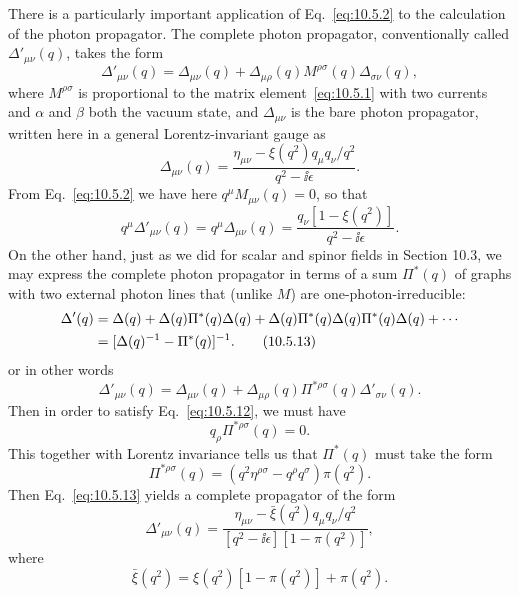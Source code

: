 There is a particularly important application of Eq.~\eqref{eq:10.5.2} to the
calculation of the photon propagator. The complete photon propagator,
conventionally called $\Delta'_{\mu\nu}(q)$, takes the form
\begin{equation}
  \Delta'_{\mu\nu}(q)=\Delta_{\mu\nu}(q)
  +\Delta_{\mu\rho}(q)M^{\rho\sigma}(q)\Delta_{\sigma\nu}(q),
  \tag{10.5.10}\label{eq:10.5.10}
\end{equation}
where $M^{\rho\sigma}$ is proportional to the matrix element~\eqref{eq:10.5.1}
with two currents and $\alpha$ and $\beta$ both the vacuum state, and
$\Delta_{\mu\nu}$ is the bare photon propagator, written here in a general
Lorentz-invariant gauge as
\begin{equation}
  \Delta_{\mu\nu}(q)
  =\frac{\eta_{\mu\nu}-\xi(q^2)q_\mu q_\nu/q^2}{q^2-\ii\epsilon}.
  \tag{10.5.11}\label{eq:10.5.11}
\end{equation}
From Eq.~\eqref{eq:10.5.2} we have here $q^\mu M_{\mu\nu}(q)=0$, so that
\begin{equation}
  q^\mu\Delta'_{\mu\nu}(q)=q^\mu\Delta_{\mu\nu}(q)
  =\frac{q_\nu[1-\xi(q^2)]}{q^2-\ii\epsilon}.
  \tag{10.5.12}\label{eq:10.5.12}
\end{equation}
On the other hand, just as we did for scalar and spinor fields in Section
10.3, we may express the complete photon propagator in terms of a sum
$\Pi^*(q)$ of graphs with two external photon lines that (unlike $M$) are
one-photon-irreducible:
\begin{align}
  \Delta'(q)={}&\Delta(q)+\Delta(q)\Pi^*(q)\Delta(q)
  +\Delta(q)\Pi^*(q)\Delta(q)\Pi^*(q)\Delta(q)+\cdots \notag\\
  ={}&[\Delta(q)^{-1}-\Pi^*(q)]^{-1}.
  \tag{10.5.13}\label{eq:10.5.13}
\end{align}
or in other words
\begin{equation}
  \Delta'_{\mu\nu}(q)=\Delta_{\mu\nu}(q)
  +\Delta_{\mu\rho}(q)\Pi^{*\rho\sigma}(q)\Delta'_{\sigma\nu}(q).
  \tag{10.5.14}\label{eq:10.5.14}
\end{equation}
Then in order to satisfy Eq.~\eqref{eq:10.5.12}, we must have
\begin{equation}
  q_\rho\Pi^{*\rho\sigma}(q)=0.
  \tag{10.5.15}\label{eq:10.5.15}
\end{equation}
This together with Lorentz invariance tells us that $\Pi^*(q)$ must take the
form
\begin{equation}
  \Pi^{*\rho\sigma}(q)=(q^2\eta^{\rho\sigma}-q^\rho q^\sigma)\pi(q^2).
  \tag{10.5.16}\label{eq:10.5.16}
\end{equation}
Then Eq.~\eqref{eq:10.5.13} yields a complete propagator of the form
\begin{equation}
  \Delta'_{\mu\nu}(q)
  =\frac{\eta_{\mu\nu}-\bar\xi(q^2)q_\mu q_\nu/q^2}
  {[q^2-\ii\epsilon][1-\pi(q^2)]},
  \tag{10.5.17}\label{eq:10.5.17}
\end{equation}
where
\begin{equation}
  \bar\xi(q^2)=\xi(q^2)[1-\pi(q^2)]+\pi(q^2).
  \tag{10.5.18}\label{eq:10.5.18}
\end{equation}


